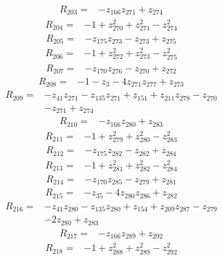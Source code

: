 \begin{align*}
R_{203}={}&-z_{166}z_{271}+z_{274}
\end{align*}
\begin{align*}
R_{204}={}&-1+z_{270}^{2}+z_{271}^{2}-z_{274}^{2}
\end{align*}
\begin{align*}
R_{205}={}&-z_{175}z_{273}-z_{273}+z_{275}
\end{align*}
\begin{align*}
R_{206}={}&-1+z_{272}^{2}+z_{273}^{2}-z_{275}^{2}
\end{align*}
\begin{align*}
R_{207}={}&-z_{170}z_{276}-z_{270}+z_{272}
\end{align*}
\begin{align*}
R_{208}={}&-1-z_{3}-4z_{271}z_{277}+z_{273}
\end{align*}
\begin{align*}
R_{209}={}&-z_{41}z_{271}-z_{135}z_{271}+z_{151}+z_{211}z_{278}-z_{270}\\
&-z_{271}+z_{274}
\end{align*}
\begin{align*}
R_{210}={}&-z_{166}z_{280}+z_{283}
\end{align*}
\begin{align*}
R_{211}={}&-1+z_{279}^{2}+z_{280}^{2}-z_{283}^{2}
\end{align*}
\begin{align*}
R_{212}={}&-z_{175}z_{282}-z_{282}+z_{284}
\end{align*}
\begin{align*}
R_{213}={}&-1+z_{281}^{2}+z_{282}^{2}-z_{284}^{2}
\end{align*}
\begin{align*}
R_{214}={}&-z_{170}z_{285}-z_{279}+z_{281}
\end{align*}
\begin{align*}
R_{215}={}&-z_{35}-4z_{280}z_{286}+z_{282}
\end{align*}
\begin{align*}
R_{216}={}&-z_{41}z_{280}-z_{135}z_{280}+z_{154}+z_{209}z_{287}-z_{279}\\
&-2z_{280}+z_{283}
\end{align*}
\begin{align*}
R_{217}={}&-z_{166}z_{289}+z_{292}
\end{align*}
\begin{align*}
R_{218}={}&-1+z_{288}^{2}+z_{289}^{2}-z_{292}^{2}
\end{align*}
